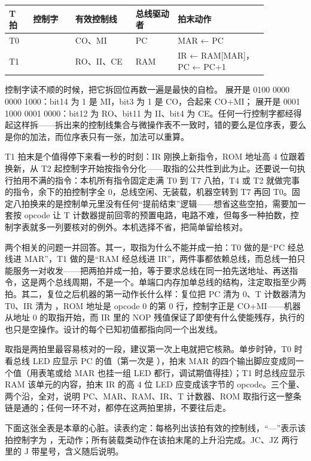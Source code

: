 \begin{longtable}{L{0.08\linewidth}L{0.14\linewidth}L{0.20\linewidth}L{0.14\linewidth}L{0.30\linewidth}}
\toprule
T 拍 & 控制字 & 有效控制线 & 总线驱动者 & 拍末动作 \\
\midrule
T0 &  & CO、MI & PC & MAR ← PC \\
T1 &  & RO、II、CE & RAM & IR ← RAM[MAR]，PC ← PC+1 \\
\bottomrule
\end{longtable}

控制字读不顺的时候，把它拆回位再数一遍是最快的自检。 展开是 0100 0000 0000 1000：bit14 为 1 是 MI，bit3 为 1 是 CO，合起来 CO+MI； 展开是 0001 1000 0001 0000：bit12 为 RO、bit11 为 II、bit4 为 CE。任何一行控制字都经得起这样拆——拆出来的控制线集合与微操作表不一致时，错的要么是位序表，要么是你的加法，而位序表只有一张，加法可以重算。

T1 拍末是个值得停下来看一秒的时刻：IR 刚换上新指令，ROM 地址高 4 位跟着换新，从 T2 起控制字开始按指令分化——取指的公共性到此为止。还要说一句执行拍用不满的指令：本机所有指令固定走满 T0 到 T7 八拍，T4 或 T2 就做完事的指令，余下的拍控制字全 0，总线空闲、无装载，机器空转到 T7 再回 T0。固定八拍换来的是控制单元里没有任何“提前结束”逻辑——想省这些空拍，需要加一套按 opcode 让 T 计数器提前回零的预置电路，电路不难，但每多一种拍数，控制字表就多一列要核对的例外。本机选择不省，把简单留给核对。

两个相关的问题一并回答。其一，取指为什么不能并成一拍：T0 做的是“PC 经总线进 MAR”，T1 做的是“RAM 经总线进 IR”，两件事都依赖总线，而总线一拍只能服务一对收发——把两拍并成一拍，等于要求总线在同一拍先送地址、再送指令，这是两个总线周期，不是一个。单端口内存加单总线的结构，注定取指至少两拍。其二，复位之后机器的第一动作长什么样：复位把 PC 清为 0、T 计数器清为 T0、IR 清为 ，ROM 地址是 opcode 0 的第 0 行，控制字正是 CO+MI——机器从地址 0 的取指开始，而 IR 里的 NOP 残值保证了即使有什么使能残存，执行的也只是空操作。设计的每个已知初值都指向同一个出发线。

取指是两拍里最容易核对的一段，建议第一次上电就把它核熟。单步时钟，T0 时看总线 LED 应显示 PC 的值（第一次是 ），拍末 MAR 的四个输出脚应变成同一个值（用表笔或给 MAR 也挂一组 LED 都行，调试期值得挂）；T1 时总线应显示 RAM 该单元的内容，拍末 IR 的高 4 位 LED 应变成该字节的 opcode。三个量、两个沿，全对，说明 PC、MAR、RAM、IR、T 计数器、ROM 取指行这一整条链是通的；任何一环不对，都停在这两拍里排，不要往后走。

下面这张全表是本章的心脏。读表约定：每格列出该拍有效的控制线，“—”表示该拍控制字为 ，无动作；所有装载类动作在该拍末尾的上升沿完成。JC、JZ 两行里的 J 带星号，含义随后说明。

